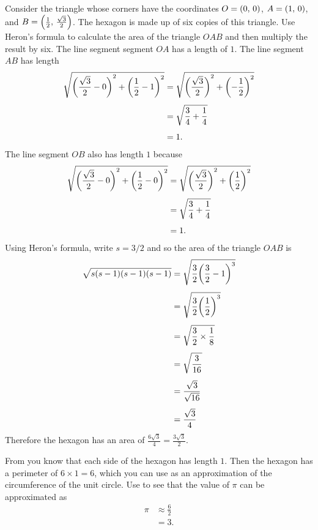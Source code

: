 \documentclass[a4paper,oneside,12pt]{article}
\begin{document}
\begin{problem}
{\begin{solution}
  Consider the triangle whose corners have the coordinates
  $O = \tuple{0}{0}$, $A = \tuple{1}{0}$, and
  $B = \tuple{\frac{1}{2}}{\frac{\sqrt{3}}{2}}$.  The hexagon is made
  up of six copies of this triangle.  Use Heron's formula to calculate
  the area of the triangle $OAB$ and then multiply the result by six.
  The line segment segment $OA$ has a length of $1$.  The line segment
  $AB$ has length
  \begin{align*}
  \sqrt{
    \parenthesis*{\frac{\sqrt{3}}{2} - 0}^2
    +
    \parenthesis*{\frac{1}{2} - 1}^2
  }
  &=
  \sqrt{
    \parenthesis*{\frac{\sqrt{3}}{2}}^2
    +
    \parenthesis*{-\frac{1}{2}}^2
  } \\[4pt]
  &=
  \sqrt{
    \frac{3}{4} + \frac{1}{4}
  } \\[4pt]
  &=
  1.
  \end{align*}
  The line segment $OB$ also has length $1$ because
  \begin{align*}
  \sqrt{
    \parenthesis*{\frac{\sqrt{3}}{2} - 0}^2
    +
    \parenthesis*{\frac{1}{2} - 0}^2
  }
  &=
  \sqrt{
    \parenthesis*{\frac{\sqrt{3}}{2}}^2
    +
    \parenthesis*{\frac{1}{2}}^2
  } \\[4pt]
  &=
  \sqrt{
    \frac{3}{4}
    +
    \frac{1}{4}
  } \\[4pt]
  &=
  1.
  \end{align*}
  Using Heron's formula, write $s = 3 / 2$ and so the area of the
  triangle $OAB$ is
  \begin{align*}
  \sqrt{
    s (s - 1) (s - 1) (s - 1)
  }
  &=
  \sqrt{
    \frac{3}{2} \parenthesis*{\frac{3}{2} - 1}^3
  } \\[4pt]
  &=
  \sqrt{
    \frac{3}{2} \parenthesis*{\frac{1}{2}}^3
  } \\[4pt]
  &=
  \sqrt{
    \frac{3}{2} \times \frac{1}{8}
  } \\[4pt]
  &=
  \sqrt{\frac{3}{16}} \\[4pt]
  &=
  \frac{\sqrt{3}}{\sqrt{16}} \\[4pt]
  &=
  \frac{\sqrt{3}}{4}
  \end{align*}
  Therefore the hexagon has an area of
  $\frac{6\sqrt{3}}{4} = \frac{3\sqrt{3}}{2}$.

  From  you know that each side of the
  hexagon has length $1$.  Then the hexagon has a perimeter of
  $6 \times 1 = 6$, which you can use as an approximation of the
  circumference of the unit circle.  Use
   to see that the value
  of $\pi$ can be approximated as
  \begin{align*}
  \pi
  &\approx
  \frac{6}{2} \\[4pt]
  &=
  3.
  \end{align*}
  \end{solution}
}{}


\end{problem}
\end{document}
